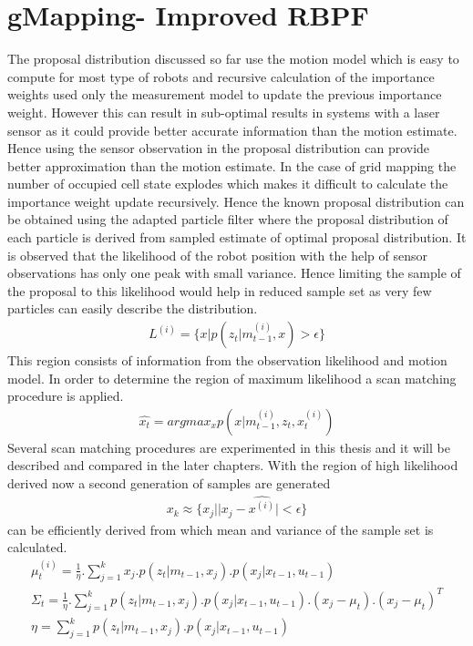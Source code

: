 \section{gMapping- Improved RBPF}
The proposal distribution discussed so far use the motion model which is easy to compute for most type of robots and recursive calculation of the importance weights used only the measurement model to update the previous importance weight. However this can result in sub-optimal results in systems with a laser sensor as it could provide better accurate information than the motion estimate\cite{GMap_algo}. Hence using the sensor observation in the proposal distribution can provide better approximation than the motion estimate. In the case of grid mapping the number of occupied cell state explodes which makes it difficult to calculate the importance weight update recursively. Hence the known proposal distribution can be obtained using the adapted particle filter where the proposal distribution of each particle is derived from sampled estimate of optimal proposal distribution. It is observed that the likelihood of the robot position with the help of sensor observations has only one peak with small variance. Hence limiting the sample of the proposal to this likelihood would help in reduced sample set as very few particles can easily describe the distribution. 
\begin{gather} \label{gMap-L}
    L^{(i)} = \{ x | p(z_t| m_{t-1}^{(i)},x)>\epsilon\} 
\end{gather}
This region consists of information from the observation likelihood and motion model. In order to determine the region of maximum likelihood a scan matching procedure is applied. 
\begin{gather} \label{gMap-SM}
    \hat{x_t} = argmax_x p(x|m_{t-1}^{(i)}, z_t, x_t^{(i)})
\end{gather}
Several scan matching procedures are experimented in this thesis and it will be described and compared in the later chapters. With the region of high likelihood derived now a second generation of samples are generated 
\begin{gather} \label{gMap-2samp}
    x_k \approx \{x_j | |x_j - \hat{x^{(i)}}|<\epsilon \}
\end{gather}
can be efficiently derived from which mean and variance of the sample set is calculated. 
\begin{gather} \label{gMap-mu}
    \mu_t^{(i)} = \frac{1}{\eta}. \sum_{j = 1}^{k}  x_j.p(z_t | m_{t-1}, x_j). p(x_j | x_{t-1}, u_{t-1}) \\
    \varSigma_t = \frac{1}{\eta}. \sum_{j = 1}^{k}  p(z_t | m_{t-1}, x_j). p(x_j | x_{t-1}, u_{t-1}).(x_j - \mu_t).(x_j - \mu_t)^T \\
    \eta = \sum_{j = 1}^{k}  p(z_t | m_{t-1}, x_j). p(x_j | x_{t-1}, u_{t-1})
\end{gather}
